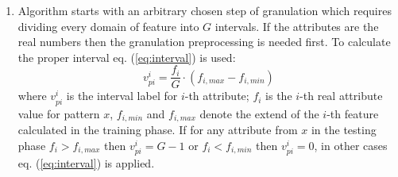 \begin{enumerate}
    \item Algorithm starts with an arbitrary chosen step of granulation which
        requires dividing every domain of feature into $G$ intervals.
        If the attributes are the real numbers then the granulation preprocessing 
        is needed first. To calculate the proper interval eq. (\ref{eq:interval})
        is used:
        \begin{equation}
            v_{pi}^{i} = \frac{f_{i}}{G}\cdot(f_{i, max}-f_{i,min})
            \label{eq:interval}
        \end{equation}
        where $v_{pi}^{i}$ is the interval label for $i$-th attribute; $f_i$ is
        the $i$-th real attribute value for pattern $x$, $f_{i,min}$ and
        $f_{i,max}$ denote the extend of the $i$-th feature calculated in the
        training phase. If for any attribute from $x$ in the testing phase 
        $f_i > f_{i, max}$ then $v_{pi}^{i}=G-1$ or $f_i < f_{i, min}$ then
        $v_{pi}^{i}=0$, in other cases eq. (\ref{eq:interval}) is applied.


\end{enumerate}
